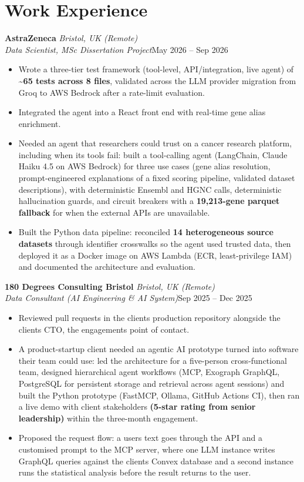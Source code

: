 \documentclass[a4paper,11pt]{article}
\newcommand{\role}[4]{%
  \textbf{#1}{\color{muted}\,\textperiodcentered\,\textit{#2}}\\
  \textit{#4}\hfill{\color{muted}#3}\par}
\newcommand{\gap}{\vspace{5pt}}
\newcommand{\num}[1]{\textbf{#1}}   %
\begin{document}
\section{Work Experience}
\role{AstraZeneca}{Bristol, UK (Remote)}{May 2026 – Sep 2026}{Data Scientist, MSc Dissertation Project}
\begin{itemize}
  \item Wrote a three-tier test framework (tool-level, API/integration, live agent) of \num{\textasciitilde{}65 tests across 8 files}, validated across the LLM provider migration from Groq to AWS Bedrock after a rate-limit evaluation.
  \item Integrated the agent into a React front end with real-time gene alias enrichment.
  \item Needed an agent that researchers could trust on a cancer research platform, including when its tools fail: built a tool-calling agent (LangChain, Claude Haiku 4.5 on AWS Bedrock) for three use cases (gene alias resolution, prompt-engineered explanations of a fixed scoring pipeline, validated dataset descriptions), with deterministic Ensembl and HGNC calls, deterministic hallucination guards, and circuit breakers with a \num{19,213-gene parquet fallback} for when the external APIs are unavailable.
  \item Built the Python data pipeline: reconciled \num{14 heterogeneous source datasets} through identifier crosswalks so the agent used trusted data, then deployed it as a Docker image on AWS Lambda (ECR, least-privilege IAM) and documented the architecture and evaluation.
\end{itemize}
\gap
{}
\role{180 Degrees Consulting Bristol}{Bristol, UK (Remote)}{Sep 2025 – Dec 2025}{Data Consultant (AI Engineering \& AI System)}
\begin{itemize}
  \item Reviewed pull requests in the client\textquotesingle{}s production repository alongside the client\textquotesingle{}s CTO, the engagement\textquotesingle{}s point of contact.
  \item A product-startup client needed an agentic AI prototype turned into software their team could use: led the architecture for a five-person cross-functional team, designed hierarchical agent workflows (MCP, Exograph GraphQL, PostgreSQL for persistent storage and retrieval across agent sessions) and built the Python prototype (FastMCP, Ollama, GitHub Actions CI), then ran a live demo with client stakeholders \num{(5-star rating from senior leadership)} within the three-month engagement.
  \item Proposed the request flow: a user\textquotesingle{}s text goes through the API and a customised prompt to the MCP server, where one LLM instance writes GraphQL queries against the client\textquotesingle{}s Convex database and a second instance runs the statistical analysis before the result returns to the user.
\end{itemize}
\end{document}
